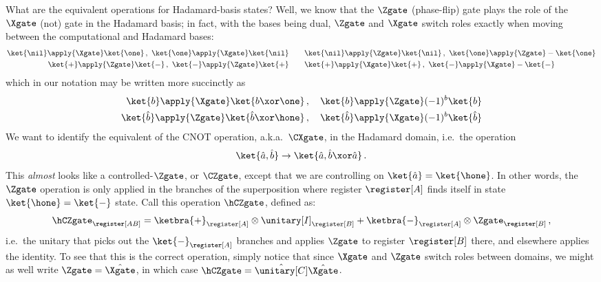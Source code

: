    What are the equivalent operations for Hadamard-basis states? Well, we know
      that the $\Zgate$ (phase-flip) gate plays the role of the $\Xgate$ (not)
      gate in the Hadamard basis; in fact, with the bases being dual, $\Zgate$
      and $\Xgate$ switch roles exactly when moving between the computational
      and Hadamard bases:
      \begin{align*}
        \ket{\nil} \apply{\Xgate} \ket{\one}\, ,\ \ket{\one} \apply{\Xgate} \ket{\nil} 
          &\qquad \ket{\nil} \apply{\Zgate} \ket{\nil}\, ,\ \ket{\one} \apply{\Zgate} -\ket{\one} \\
        \ket{+} \apply{\Zgate} \ket{-}\, ,\ \ket{-} \apply{\Zgate} \ket{+}
          &\qquad \ket{+} \apply{\Xgate} \ket{+}\, ,\ \ket{-} \apply{\Xgate} -\ket{-}
      \end{align*}
      which in our notation may be written more succinctly as
      \begin{align*}
        \ket{b} \apply{\Xgate} \ket{b \xor \one}\, &,\quad \ket{b} \apply{\Zgate} (-1)^b \ket{b} \\
        \ket{\hat{b}} \apply{\Zgate} \ket{\hat{b} \xor \hone}\, &,\quad \ket{\hat{b}} \apply{\Xgate} (-1)^b \ket{\hat{b}}
      \end{align*}
      We want to identify the equivalent of the CNOT operation,
      a.k.a.\ $\CXgate$, in the Hadamard domain, i.e.\ the operation
      \[
        \ket{\hat{a}, \hat{b}} \to \ket{\hat{a}, \hat{b} \xor \hat{a}}\, .
      \]
      This \emph{almost} looks like a controlled-$\Zgate$, or $\CZgate$, except that we
      are controlling on $\ket{\hat a} = \ket{\hone}$. In other words, the
      $\Zgate$ operation is only applied in the branches of the superposition
      where register $\register[A]$ finds itself in state $\ket{\hone} = \ket{-}$ state. 
      Call this operation $\hCZgate$, defined as:
      \[
        \hCZgate_{\register[AB]} = 
          \ketbra{+}_{\register[A]} \otimes \unitary[I]_{\register[B]}
          + \ketbra{-}_{\register[A]} \otimes \Zgate_{\register[B]}\, ,
      \]
      i.e.\ the unitary that picks out the $\ket{-}_{\register[A]}$ branches and
        applies $\Zgate$ to register $\register[B]$ there, and elsewhere applies the
        identity. To see that this is the correct operation, simply notice that since 
        $\Xgate$ and $\Zgate$ switch roles between domains, 
        we might as well write $\Zgate = \hat{\Xgate}$, in which case
        $\hCZgate = \hat{\unitary[C]}\hat\Xgate$.

